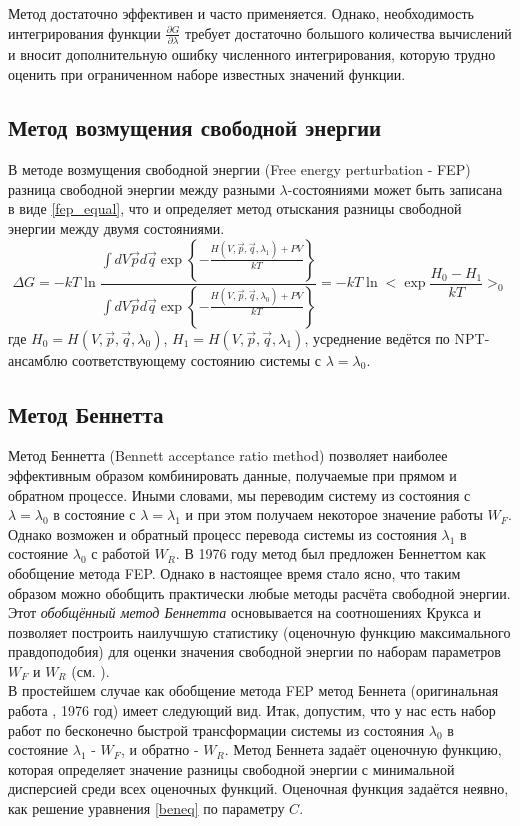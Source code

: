 Метод достаточно эффективен и часто применяется. Однако, необходимость интегрирования функции $\frac{\partial G}{\partial \lambda}$ требует достаточно большого количества вычислений и вносит дополнительную ошибку численного интегрирования, которую трудно оценить при ограниченном наборе известных значений функции.

\subsection{Метод возмущения свободной энергии} 
В методе возмущения свободной энергии (Free energy perturbation - FEP) разница свободной энергии между разными $\lambda$-состояниями может быть записана в виде \ref{fep_equal}, что и определяет метод отыскания разницы свободной энергии между двумя состояниями.
\begin{equation}
\Delta G=-kT \ln{\frac{\int dV\vec{p}d\vec{q}\exp \left \{ -\frac{H(V,\vec{p},\vec{q},\lambda_1)+PV}{kT} \right \}}{\int dV\vec{p}d\vec{q}\exp \left \{ -\frac{H(V,\vec{p},\vec{q},\lambda_0)+PV}{kT} \right \}}}=-kT
 \ln{<\exp{\frac{H_0-H_1}{kT}}>_0}
\label{fep_equal}	
\end{equation}
где $H_0=H(V,\vec{p},\vec{q},\lambda_0)$, $H_1=H(V,\vec{p},\vec{q},\lambda_1)$, усреднение ведётся по NPT-ансамблю соответствующему состоянию системы с $\lambda=\lambda_0$.

\subsection{Метод Беннетта}
Метод Беннетта (Bennett acceptance ratio method) позволяет наиболее эффективным образом комбинировать данные, получаемые при прямом и обратном процессе. Иными словами, мы переводим систему из состояния с $\lambda=\lambda_0$ в состояние с $\lambda=\lambda_1$ и при этом получаем некоторое значение работы $W_F$. Однако возможен и обратный процесс перевода системы из состояния $\lambda_1$ в состояние $\lambda_0$ с работой $W_R$. В 1976 году метод был предложен Беннеттом \cite{bennet} как обобщение метода FEP. Однако в настоящее время стало ясно, что таким образом можно обобщить практически любые методы расчёта свободной энергии. Этот \textit{обобщённый метод Беннетта} основывается на соотношениях Крукса и позволяет построить наилучшую статистику (оценочную функцию максимального правдоподобия) для оценки значения свободной энергии по наборам параметров $W_F$ и $W_R$ (см. \cite{stanford_ben}).\\

В простейшем случае как обобщение метода FEP метод Беннета (оригинальная работа \cite{bennet}, 1976 год) имеет следующий вид.
Итак, допустим, что у нас есть набор работ по бесконечно быстрой трансформации системы из состояния $\lambda_0$ в состояние $\lambda_1$ - ${W_F}$, и обратно - ${W_R}$. Метод Беннета задаёт оценочную функцию, которая определяет значение разницы свободной энергии с минимальной дисперсией среди всех оценочных функций.
Оценочная функция задаётся неявно, как решение уравнения \ref{beneq} по параметру $C$.

